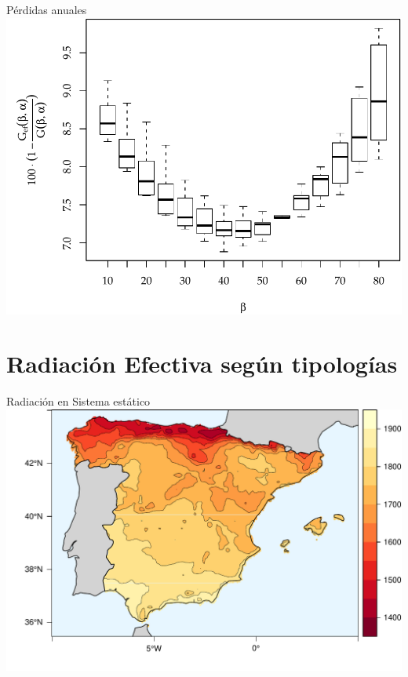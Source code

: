 \documentclass[xcolor={usenames,svgnames,dvipsnames}]{beamer}
\begin{document}
\begin{frame}[label=sec-3-3-4]{Pérdidas anuales}
\includegraphics[width=.9\linewidth]{../figs/GefVSG.pdf}
\end{frame}

\section{Radiación Efectiva según tipologías}
\label{sec-4}



\begin{frame}[label=sec-4-0-1]{Radiación en Sistema estático}
\includegraphics[width=.9\linewidth]{../figs/FixedKrig.pdf}
\end{frame}
\end{document}
